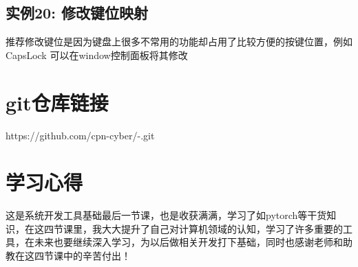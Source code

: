 \documentclass[a4paper, 12pt]{article}
\begin{document}
              \subsection{实例20: 修改键位映射}
              推荐修改键位是因为键盘上很多不常用的功能却占用了比较方便的按键位置，例如CapsLock
              可以在window控制面板将其修改
              \section{git仓库链接}
              https://github.com/cpn-cyber/-.git
              \section{学习心得}
              这是系统开发工具基础最后一节课，也是收获满满，学习了如pytorch等干货知识，在这四节课里，我大大提升了自己对计算机领域的认知，学习了许多重要的工具，在未来也要继续深入学习，为以后做相关开发打下基础，同时也感谢老师和助教在这四节课中的辛苦付出！

        
\end{document}
